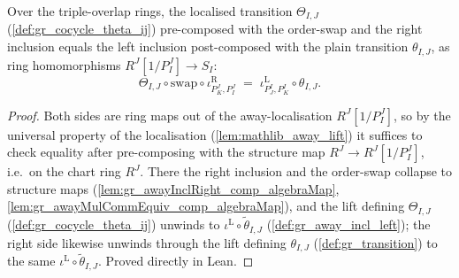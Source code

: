 \begin{lemma}

  \label{lem:gr_chartTransition'_ringIdentity}
  Over the triple-overlap rings, the localised transition \(\Theta_{I,J}\)
  (\cref{def:gr_cocycle_theta_ij}) pre-composed with the order-swap and the right
  inclusion equals the left inclusion post-composed with the plain transition
  \(\theta_{I,J}\), as ring homomorphisms \(R^J[1/P^J_I] \to S_I\):
  \[
    \Theta_{I,J} \circ \mathrm{swap} \circ \iota^{\mathrm{R}}_{P^J_K, P^J_I}
      \;=\; \iota^{\mathrm{L}}_{P^I_J, P^I_K} \circ \theta_{I,J} .
  \]
\end{lemma}
\begin{proof}
  \leanok
  Both sides are ring maps out of the away-localisation \(R^J[1/P^J_I]\), so by the
  universal property of the localisation (\cref{lem:mathlib_away_lift}) it suffices
  to check equality after pre-composing with the structure map
  \(R^J \to R^J[1/P^J_I]\), i.e.\ on the chart ring \(R^J\). There the right
  inclusion and the order-swap collapse to structure maps
  (\cref{lem:gr_awayInclRight_comp_algebraMap},
  \cref{lem:gr_awayMulCommEquiv_comp_algebraMap}), and the lift defining
  \(\Theta_{I,J}\) (\cref{def:gr_cocycle_theta_ij}) unwinds to
  \(\iota^{\mathrm{L}} \circ \tilde\theta_{I,J}\)
  (\cref{def:gr_away_incl_left}); the right side likewise unwinds through the lift
  defining \(\theta_{I,J}\) (\cref{def:gr_transition}) to the same
  \(\iota^{\mathrm{L}} \circ \tilde\theta_{I,J}\). Proved directly in Lean.
\end{proof}

